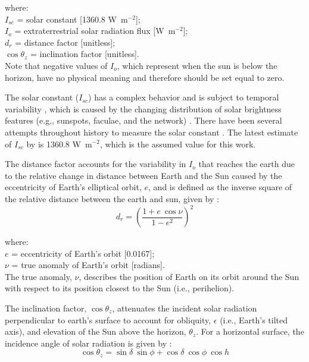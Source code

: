 \noindent where: \\
\indent $I_{sc}$ = solar constant [1360.8 W~m$^{-2}$];\\
\indent $I_{o}$ = extraterrestrial solar radiation flux [W~m$^{-2}$];\\
\indent $d_{r}$ = distance factor [unitless];\\
\indent $\cos \theta_z$ = inclination factor [unitless].\\

\noindent Note that negative values of $I_o$, which represent when the sun is below the horizon, have no physical meaning and therefore should be set equal to zero.

The solar constant ($I_{sc}$) has a complex behavior and is subject to temporal variability \parencite{crommelynck97}, which is caused by the changing distribution of solar brightness features (e.g., sunspots, faculae, and the network) \parencite{krivova10}. 
There have been several attempts throughout history to measure the solar constant \parencite[e.g.,][]{thekaekara71,willson97,dewitte04,frohlich06}. 
The latest estimate of $I_{sc}$ by \cite{kopp11} is 1360.8 W~m$^{-2}$, which is the assumed value for this work.

The distance factor accounts for the variability in $I_o$ that reaches the earth due to the relative change in distance between Earth and the Sun caused by the eccentricity of Earth's elliptical orbit, $e$, and is defined as the inverse square of the relative distance between the earth and sun, given by \parencite{berger93}:
\begin{equation}
\label{eq:dr}
    d_{r} = \left(\frac{1 + e\: \cos\nu}{1 - e^2}\right)^2
\end{equation}

\noindent where:\\
\indent $e$ = eccentricity of Earth's orbit [0.0167];\\
\indent $\nu$ = true anomaly of Earth's orbit [radians].\\

The true anomaly, $\nu$, describes the position of Earth on its orbit around the Sun with respect to its position closest to the Sun (i.e., perihelion). 

The inclination factor, $\cos \theta_z$, attenuates the incident solar radiation perpendicular to earth's surface to account for obliquity, $\epsilon$ (i.e., Earth's tilted axis), and elevation of the Sun above the horizon, $\theta_z$. 
For a horizontal surface, the incidence angle of solar radiation is given by \parencite{duffie13}:
\begin{equation}
\label{eq:thetaz}
	\cos \theta_z = \sin\delta\: \sin\phi + 
	                \cos\delta\: \cos\phi\: \cos h
\end{equation}

